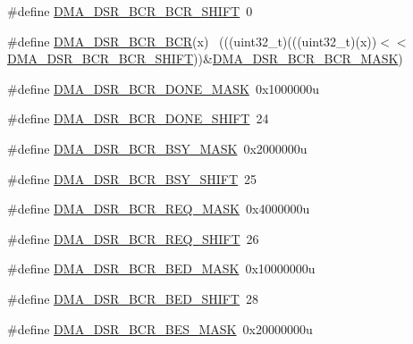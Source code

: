 \begin{DoxyCompactItemize}
\item 
\#define \hyperlink{group___d_m_a___register___masks_ga7eb36602370f4118640f57d51913ff89}{D\+M\+A\+\_\+\+D\+S\+R\+\_\+\+B\+C\+R\+\_\+\+B\+C\+R\+\_\+\+S\+H\+I\+FT}~0
\item 
\#define \hyperlink{group___d_m_a___register___masks_ga8053d32b4561ea43f67ad34a59db1afe}{D\+M\+A\+\_\+\+D\+S\+R\+\_\+\+B\+C\+R\+\_\+\+B\+CR}(x)                                          ~(((uint32\+\_\+t)(((uint32\+\_\+t)(x))$<$$<$\hyperlink{group___d_m_a___register___masks_ga7eb36602370f4118640f57d51913ff89}{D\+M\+A\+\_\+\+D\+S\+R\+\_\+\+B\+C\+R\+\_\+\+B\+C\+R\+\_\+\+S\+H\+I\+FT}))\&\hyperlink{group___d_m_a___register___masks_ga51f1a407dbca889f0b21bb1eeaa1c5d0}{D\+M\+A\+\_\+\+D\+S\+R\+\_\+\+B\+C\+R\+\_\+\+B\+C\+R\+\_\+\+M\+A\+SK})
\item 
\#define \hyperlink{group___d_m_a___register___masks_gaaa733d9c65fb074a9e836b8abaa8173f}{D\+M\+A\+\_\+\+D\+S\+R\+\_\+\+B\+C\+R\+\_\+\+D\+O\+N\+E\+\_\+\+M\+A\+SK}~0x1000000u
\item 
\#define \hyperlink{group___d_m_a___register___masks_gaa9063734a56a62385b42210acedc3144}{D\+M\+A\+\_\+\+D\+S\+R\+\_\+\+B\+C\+R\+\_\+\+D\+O\+N\+E\+\_\+\+S\+H\+I\+FT}~24
\item 
\#define \hyperlink{group___d_m_a___register___masks_ga517e206a9b5422e95b875d13973d6888}{D\+M\+A\+\_\+\+D\+S\+R\+\_\+\+B\+C\+R\+\_\+\+B\+S\+Y\+\_\+\+M\+A\+SK}~0x2000000u
\item 
\#define \hyperlink{group___d_m_a___register___masks_gaa9f53140b5fb6fbbf7cae9d4190bac47}{D\+M\+A\+\_\+\+D\+S\+R\+\_\+\+B\+C\+R\+\_\+\+B\+S\+Y\+\_\+\+S\+H\+I\+FT}~25
\item 
\#define \hyperlink{group___d_m_a___register___masks_ga24c6d2ae6aa7b472b69e357ef0729902}{D\+M\+A\+\_\+\+D\+S\+R\+\_\+\+B\+C\+R\+\_\+\+R\+E\+Q\+\_\+\+M\+A\+SK}~0x4000000u
\item 
\#define \hyperlink{group___d_m_a___register___masks_gae04420d59dbb4e54831ac0ddb67d6f74}{D\+M\+A\+\_\+\+D\+S\+R\+\_\+\+B\+C\+R\+\_\+\+R\+E\+Q\+\_\+\+S\+H\+I\+FT}~26
\item 
\#define \hyperlink{group___d_m_a___register___masks_ga958e11f5f7fed3d90bdb94d1c1ff4179}{D\+M\+A\+\_\+\+D\+S\+R\+\_\+\+B\+C\+R\+\_\+\+B\+E\+D\+\_\+\+M\+A\+SK}~0x10000000u
\item 
\#define \hyperlink{group___d_m_a___register___masks_ga7219c99c1ea8c8a5c029fc998753606b}{D\+M\+A\+\_\+\+D\+S\+R\+\_\+\+B\+C\+R\+\_\+\+B\+E\+D\+\_\+\+S\+H\+I\+FT}~28
\item 
\#define \hyperlink{group___d_m_a___register___masks_ga64861328d89d08de32a89fb60eee1f78}{D\+M\+A\+\_\+\+D\+S\+R\+\_\+\+B\+C\+R\+\_\+\+B\+E\+S\+\_\+\+M\+A\+SK}~0x20000000u
$$
\end{DoxyCompactItemize}
